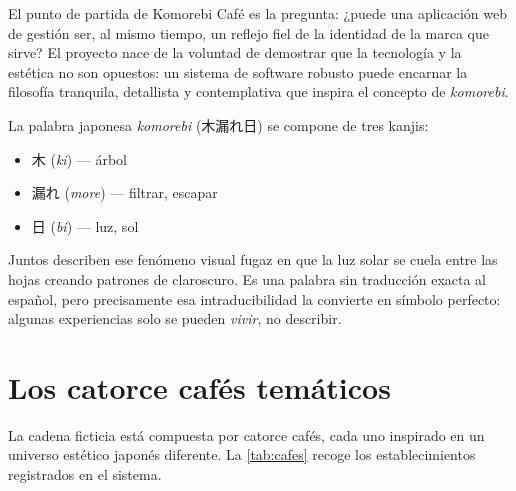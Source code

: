 \documentclass[12pt,a4paper,twoside,openright]{report}
\begin{document}
El punto de partida de Komorebi Café es la pregunta: ¿puede una aplicación web de gestión
ser, al mismo tiempo, un reflejo fiel de la identidad de la marca que sirve? El proyecto
nace de la voluntad de demostrar que la tecnología y la estética no son opuestos: un
sistema de software robusto puede encarnar la filosofía tranquila, detallista y contemplativa
que inspira el concepto de \textit{komorebi}.

La palabra japonesa \textit{komorebi} (木漏れ日) se compone de tres kanjis:
\begin{itemize}[nosep]
  \item 木 (\textit{ki}) — árbol
  \item 漏れ (\textit{more}) — filtrar, escapar
  \item 日 (\textit{bi}) — luz, sol
\end{itemize}

Juntos describen ese fenómeno visual fugaz en que la luz solar se cuela entre las hojas
creando patrones de claroscuro. Es una palabra sin traducción exacta al español, pero
precisamente esa intraducibilidad la convierte en símbolo perfecto: algunas experiencias
solo se pueden \textit{vivir}, no describir.

\section{Los catorce cafés temáticos}
\label{sec:cafes}

La cadena ficticia está compuesta por catorce cafés, cada uno inspirado en un universo
estético japonés diferente. La \cref{tab:cafes} recoge los establecimientos registrados
en el sistema.
\end{document}
